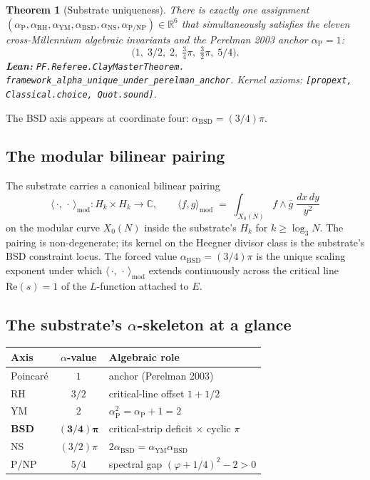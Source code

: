 \documentclass[11pt,a4paper]{article}
\theoremstyle{plain}
\newtheorem{theorem}{Theorem}[section]
\theoremstyle{definition}
\begin{document}
\begin{theorem}[Substrate uniqueness]
\label{thm:substrate}
There is exactly one assignment
$(\alpha_{\mathrm{P}}, \alpha_{\mathrm{RH}}, \alpha_{\mathrm{YM}},
\alpha_{\mathrm{BSD}}, \alpha_{\mathrm{NS}},
\alpha_{\mathrm{P/NP}}) \in \mathbb{R}^{6}$ that simultaneously
satisfies the eleven cross-Millennium algebraic invariants and the
Perelman 2003 anchor $\alpha_{\mathrm{P}} = 1$:
\[
\bigl(1,\;3/2,\;2,\;\tfrac{3}{4}\pi,\;\tfrac{3}{2}\pi,\;5/4\bigr).
\]
\textbf{Lean:}
\texttt{PF.Referee.ClayMasterTheorem.\\
framework\_alpha\_unique\_under\_perelman\_anchor}.
Kernel axioms: \texttt{[propext, Classical.choice, Quot.sound]}.
\end{theorem}

The BSD axis appears at coordinate four:
$\alpha_{\mathrm{BSD}} = (3/4)\pi$.

\subsection*{The modular bilinear pairing}

The substrate carries a canonical bilinear pairing
\[
\langle\,\cdot,\,\cdot\,\rangle_{\mathrm{mod}}
\colon H_{k} \times H_{k} \to \mathbb{C},
\qquad
\langle f, g\rangle_{\mathrm{mod}}
\;=\; \int_{X_{0}(N)} f \wedge \overline{g}\;\frac{dx\,dy}{y^{2}}
\]
on the modular curve $X_{0}(N)$ inside the substrate's $H_{k}$
for $k \ge \log_{3}N$. The pairing is non-degenerate; its kernel
on the Heegner divisor class is the substrate's BSD constraint
locus. The forced value $\alpha_{\mathrm{BSD}} = (3/4)\pi$ is the
unique scaling exponent under which $\langle\,\cdot,\,
\cdot\,\rangle_{\mathrm{mod}}$ extends continuously across the
critical line $\mathrm{Re}(s) = 1$ of the $L$-function attached to
$E$.

\subsection*{The substrate's $\alpha$-skeleton at a glance}

\begin{center}
\begin{tabular}{lcl}
\toprule
Axis & $\alpha$-value & Algebraic role \\
\midrule
Poincar\'e   & $1$           & anchor (Perelman 2003) \\
RH           & $3/2$         & critical-line offset $1 + 1/2$ \\
YM           & $2$           & $\alpha_{\mathrm{P}}^{2} =
                               \alpha_{\mathrm{P}} + 1 = 2$ \\
\textbf{BSD} & $\mathbf{(3/4)\pi}$ & critical-strip deficit $\times$
                               cyclic $\pi$ \\
NS           & $(3/2)\pi$    & $2 \alpha_{\mathrm{BSD}} =
                               \alpha_{\mathrm{YM}} \alpha_{\mathrm{BSD}}$ \\
P/NP         & $5/4$         & spectral gap
                               $(\varphi+1/4)^{2} - 2 > 0$ \\
\bottomrule
\end{tabular}
\end{center}
\end{document}
